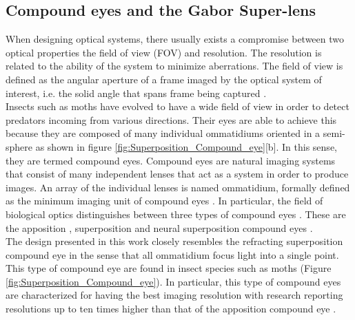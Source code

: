\subsection{Compound eyes and the Gabor Super-lens}
When designing optical systems, there usually exists a compromise between two optical properties the field of view (FOV) and resolution. The resolution is related to the ability of the system to minimize aberrations. The field of view is defined as the angular aperture of a frame imaged by the optical system of interest, i.e. the solid angle that spans frame being captured \cite{dobbert2006matchmoving}.\\

Insects such as moths have evolved to have a wide field of view in order to detect predators incoming from various directions. Their eyes are able to achieve this because they are composed of many individual ommatidiums oriented in a semi-sphere as shown in figure \ref{fig:Superposition_Compound_eye}[b]. In this sense, they are termed compound eyes. Compound eyes are natural imaging systems that consist of many independent lenses that act as a system in order to produce images.  An array of the individual lenses is named ommatidium, formally defined as the minimum imaging unit of compound eyes \cite{cheng2019review}. In particular, the field of biological optics distinguishes between three types of compound eyes \cite{volkel2003miniaturized}. These are the apposition \cite{fallah2010mtf}, superposition \cite{greiner2004retinal} and neural superposition compound eyes \cite{frederiksen2008visual}. \\

The design presented in this work closely resembles the refracting superposition compound eye in the sense that all ommatidium focus light into a single point. This type of compound eye are found in insect species such as moths (Figure \ref{fig:Superposition_Compound_eye}).  In particular, this type of compound eyes are characterized for having the best imaging resolution with research reporting resolutions up to ten times higher than that of the apposition compound eye \cite{stollberg2009gabor,kirschfeld1974absolute}. \\

